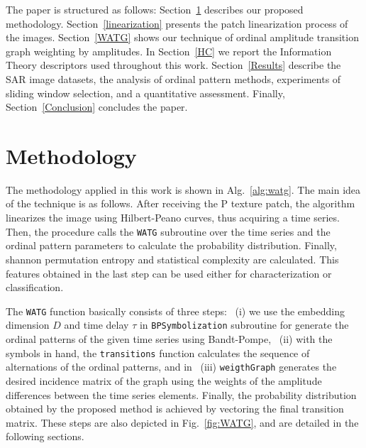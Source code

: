 \documentclass[journal]{IEEEtran}
\begin{document}
The paper is structured as follows:
Section~\ref{methodology} describes our proposed methodology.
Section~\ref{linearization} presents the patch linearization process of the images.
Section~\ref{WATG} shows our technique of ordinal amplitude transition graph weighting by amplitudes.
In Section~\ref{HC} we report the Information Theory descriptors used throughout this work.
Section~\ref{Results} describe the SAR image datasets, 
the analysis of ordinal pattern methods, 
experiments of sliding window selection, 
and a quantitative assessment.
Finally, Section~\ref{Conclusion} concludes the paper.

\section{Methodology}\label{methodology}

The methodology applied in this work is shown in Alg.~\ref{alg:watg}.
The main idea of the technique is as follows.
After receiving the P texture patch, the algorithm linearizes the image using Hilbert-Peano curves, thus acquiring a time series.
Then, the procedure calls the \texttt{WATG} subroutine over the time series and the ordinal pattern parameters to calculate the probability distribution.
Finally, shannon permutation entropy and statistical complexity are calculated.
This features obtained in the last step can be used either for characterization or classification.

The \texttt{WATG} function basically consists of three steps: ~(i) we use the embedding dimension $D$ and time delay $\tau$ in \texttt{BPSymbolization} subroutine for generate the ordinal patterns of the given time series using Bandt-Pompe, ~(ii) with the symbols in hand, the \texttt{transitions} function calculates the sequence of alternations of the ordinal patterns, and in ~(iii) \texttt{weigthGraph} generates the desired incidence matrix of the graph using the weights of the amplitude differences between the time series elements.
Finally, the probability distribution obtained by the proposed method is achieved by vectoring the final transition matrix.
These steps are also depicted in Fig.~\ref{fig:WATG}, and are detailed in the following sections.
\end{document}
